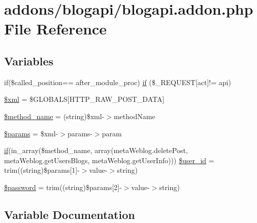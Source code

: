 \hypertarget{blogapi_8addon_8php}{}\section{addons/blogapi/blogapi.addon.\+php File Reference}
\label{blogapi_8addon_8php}
\subsection*{Variables}
\begin{DoxyCompactItemize}
\item 
if(\$called\+\_\+position== \textquotesingle{}after\+\_\+module\+\_\+proc\textquotesingle{}) \hyperlink{blogapi_8addon_8php_ae00067f6d78515f89a86a2a7f42cdc80}{if} (\$\+\_\+\+R\+E\+Q\+U\+E\+S\+T\mbox{[}\textquotesingle{}act\textquotesingle{}\mbox{]}!= \textquotesingle{}api\textquotesingle{})
\item 
\hyperlink{blogapi_8addon_8php_aa108d9d91e700ac530401dd363b0723b}{\$xml} = \$G\+L\+O\+B\+A\+L\+S\mbox{[}\textquotesingle{}H\+T\+T\+P\+\_\+\+R\+A\+W\+\_\+\+P\+O\+S\+T\+\_\+\+D\+A\+T\+A\textquotesingle{}\mbox{]}
\item 
\hyperlink{blogapi_8addon_8php_a88c34f4701e451bbcef63e44e5902ebd}{\$method\+\_\+name} = (string)\$xml-\/$>$method\+Name
\item 
\hyperlink{blogapi_8addon_8php_afe68e6fbe7acfbffc0af0c84a1996466}{\$params} = \$xml-\/$>$params-\/$>$param
\item 
\hyperlink{config_8inc_8php_ac202e21c80d0f28d495d074d3c23e1ca}{if}(in\+\_\+array(\$method\+\_\+name, array(\textquotesingle{}meta\+Weblog.\+delete\+Post\textquotesingle{}, \textquotesingle{}meta\+Weblog.\+get\+Users\+Blogs\textquotesingle{}, \textquotesingle{}meta\+Weblog.\+get\+User\+Info\textquotesingle{}))) \hyperlink{blogapi_8addon_8php_a6d0a036129b3030ce289a026c5e1eff2}{\$user\+\_\+id} = trim((string)\$params\mbox{[}1\mbox{]}-\/$>$value-\/$>$string)
\item 
\hyperlink{blogapi_8addon_8php_a607686ef9f99ea7c42f4f3dd3dbb2b0d}{\$password} = trim((string)\$params\mbox{[}2\mbox{]}-\/$>$value-\/$>$string)
\end{DoxyCompactItemize}


\subsection{Variable Documentation}
\hypertarget{blogapi_8addon_8php_a88c34f4701e451bbcef63e44e5902ebd}{}
